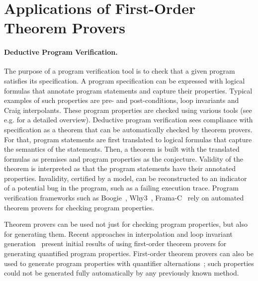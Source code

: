 \section*{Applications of First-Order Theorem Provers}



\paragraph{Deductive Program Verification.}
The purpose of a program verification tool is to check that a given program satisfies its specification. A program specification can be expressed with logical formulas that annotate program statements and capture their properties. Typical examples of such properties are pre- and post-conditions, loop invariants and Craig interpolants. These program properties are checked using various tools (see e.g. \cite{Bonacina10} for a detailed overview). Deductive program verification sees compliance with specification as a theorem that can be automatically checked by theorem provers. For that, program statements are first translated to logical formulas that capture the semantics of the statements. Then, a theorem is built with the translated formulas as premises and program properties as the conjecture. Validity of the theorem is interpreted as that the program statements have their annotated properties. Invalidity, certified by a model, can be reconstructed to an indicator of a potential bug in the program, such as a failing execution trace. Program verification frameworks such as Boogie~\cite{DBLP:conf/fmco/BarnettCDJL05}, Why3~\cite{DBLP:conf/esop/FilliatreP13}, Frama-C~\cite{FramaC} rely on automated theorem provers for checking program properties.

Theorem provers can be used not just for checking program properties, but also for generating them. Recent approaches in interpolation and loop invariant generation~\cite{McMillan08,fase2009,hoder2012popl} present initial results of using first-order theorem provers for generating quantified program properties. First-order theorem provers can also be used to generate program properties with quantifier alternations~\cite{fase2009}; such properties could not be generated fully automatically by any previously known method.

